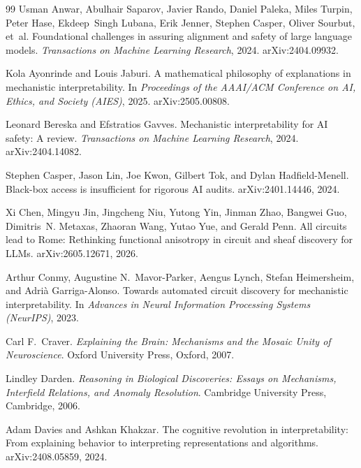 \documentclass{article}
\begin{document}
\begin{thebibliography}{99}
Usman Anwar, Abulhair Saparov, Javier Rando, Daniel Paleka, Miles Turpin, Peter
  Hase, Ekdeep~Singh Lubana, Erik Jenner, Stephen Casper, Oliver Sourbut, et~al.
\newblock Foundational challenges in assuring alignment and safety of large
  language models.
\newblock \emph{Transactions on Machine Learning Research}, 2024.
\newblock arXiv:2404.09932.

Kola Ayonrinde and Louis Jaburi.
\newblock A mathematical philosophy of explanations in mechanistic
  interpretability.
\newblock In \emph{Proceedings of the AAAI/ACM Conference on AI, Ethics, and
  Society (AIES)}, 2025.
\newblock arXiv:2505.00808.

Leonard Bereska and Efstratios Gavves.
\newblock Mechanistic interpretability for {AI} safety: A review.
\newblock \emph{Transactions on Machine Learning Research}, 2024.
\newblock arXiv:2404.14082.

Stephen Casper, Jason Lin, Joe Kwon, Gilbert Tok, and Dylan Hadfield-Menell.
\newblock Black-box access is insufficient for rigorous {AI} audits.
\newblock arXiv:2401.14446, 2024.

Xi Chen, Mingyu Jin, Jingcheng Niu, Yutong Yin, Jinman Zhao, Bangwei Guo,
  Dimitris~N. Metaxas, Zhaoran Wang, Yutao Yue, and Gerald Penn.
\newblock All circuits lead to {R}ome: Rethinking functional anisotropy in
  circuit and sheaf discovery for {LLM}s.
\newblock arXiv:2605.12671, 2026.

Arthur Conmy, Augustine N.\ Mavor-Parker, Aengus Lynch, Stefan Heimersheim,
  and Adri\`{a} Garriga-Alonso.
\newblock Towards automated circuit discovery for mechanistic interpretability.
\newblock In \emph{Advances in Neural Information Processing Systems (NeurIPS)}, 2023.

Carl F.\ Craver.
\newblock \emph{Explaining the Brain: Mechanisms and the Mosaic Unity of
  Neuroscience}.
\newblock Oxford University Press, Oxford, 2007.

Lindley Darden.
\newblock \emph{Reasoning in Biological Discoveries: Essays on Mechanisms,
  Interfield Relations, and Anomaly Resolution}.
\newblock Cambridge University Press, Cambridge, 2006.

Adam Davies and Ashkan Khakzar.
\newblock The cognitive revolution in interpretability: From explaining
  behavior to interpreting representations and algorithms.
\newblock arXiv:2408.05859, 2024.


\end{thebibliography}
\end{document}
